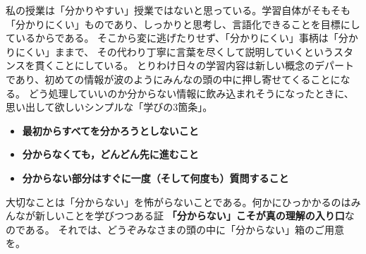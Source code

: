   私の授業は「分かりやすい」授業ではないと思っている。学習自体がそもそも
  「分かりにくい」ものであり、しっかりと思考し、言語化できることを目標にしているからである。
  そこから変に逃げたりせず、「分かりにくい」事柄は「分かりにくい」ままで、
  その代わり丁寧に言葉を尽くして説明していくというスタンスを貫くことにしている。
  とりわけ日々の学習内容は新しい概念のデパートであり、初めての情報が波のようにみんなの頭の中に押し寄せてくることになる。
  どう処理していいのか分からない情報に飲み込まれそうになったときに、思い出して欲しいシンプルな「学びの3箇条」。
  \begin{itemize}
    \item \textbf{最初からすべてを分かろうとしないこと}
    \item \textbf{分からなくても，どんどん先に進むこと}
    \item \textbf{分からない部分はすぐに一度（そして何度も）質問すること}
  \end{itemize}
  大切なことは「分からない」を怖がらないことである。何かにひっかかるのはみんなが新しいことを学びつつある証
  \textbf{「分からない」こそが真の理解の入り口}なのである。
  それでは、どうぞみなさまの頭の中に「分からない」箱のご用意を。

  \newpage
